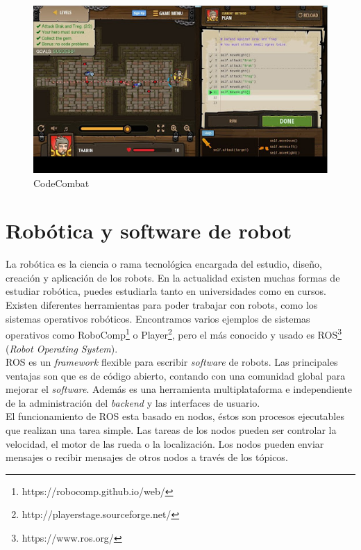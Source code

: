 \begin{figure}[H]
    \centering
    \includegraphics[width=13cm, keepaspectratio]{img/Codecombat.jpg}
    \caption{CodeCombat}
    \label{fig:codecombat}
\end{figure}

\section{Robótica y software de robot}
La robótica es la ciencia o rama tecnológica encargada del estudio, diseño, creación y aplicación de los robots. En la actualidad existen muchas formas de estudiar robótica, puedes estudiarla tanto en universidades como en cursos. Existen diferentes herramientas para poder trabajar con robots, como los sistemas operativos robóticos. Encontramos varios ejemplos de sistemas operativos como RoboComp\footnote{https://robocomp.github.io/web/} o Player\footnote{http://playerstage.sourceforge.net/}, pero el más conocido y usado es ROS\footnote{https://www.ros.org/} (\textit{Robot Operating System}).\\

ROS  es un \textit{framework} flexible para escribir \textit{software} de robots. Las principales ventajas son que es de código abierto, contando con una comunidad global para mejorar el\textit{ software}. Además es una herramienta multiplataforma e independiente de la administración del \textit{backend} y las interfaces de usuario\cite{ros}.\\

El funcionamiento de ROS esta basado en nodos, éstos son procesos ejecutables que realizan una tarea simple. Las tareas de los nodos pueden ser controlar la velocidad, el motor de las rueda o la localización. Los nodos pueden enviar mensajes o recibir mensajes de otros nodos a través de los tópicos. \\

